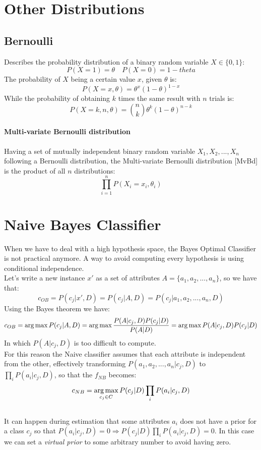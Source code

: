 \section{Other Distributions}

\subsection{Bernoulli}
Describes the probability distribution of a binary random variable $X \in \lbrace 0,1 \rbrace$:
\[P(X=1)=\theta \quad P(X=0)=1-theta\]
The probability of $X$ being a certain value $x$, given $\theta$ is:
\[P(X=x,\theta)=\theta^x(1-\theta)^{1-x}\]
While the probability of obtaining $k$ times the same result with $n$ trials is:
\[P(X=k,n,\theta)=\binom{n}{k} \theta^k(1-\theta)^{n-k}\]

\paragraph{Multi-variate Bernoulli distribution}
Having a set of mutually independent binary random variable $X_1,X_2,...,X_n$ following a Bernoulli distribution, the Multi-variate Bernoulli distribution [MvBd] is the product of all $n$ distributions:
\[\prod_{i=1}^n P(X_i=x_i,\theta_i)\]


\section{Naive Bayes Classifier}
When we have to deal with a high hypothesis space, the Bayes Optimal Classifier  is not practical anymore. A way to avoid computing every hypothesis is using conditional independence.\\
Let's write a new instance $x'$ as a set of attributes $A=\lbrace a_1,a_2,...,a_n\rbrace$, so we have that:
\[c_{OB}=P(c_j| x',D)=P(c_j| A,D)=P(c_j| a_1,a_2,...,a_n,D)\]
Using the Bayes theorem we have:
\[c_{OB}=\operatorname*{arg\,max} P(c_j| A,D)=\operatorname*{arg\,max} \frac{P(A|c_j,D)P(c_j|D)}{P(A|D)}=\operatorname*{arg\,max} P(A|c_j,D)P(c_j|D)\]
In which $P(A|c_j,D)$ is too difficult to compute.\\
For this reason the Naive classifier assumes that each attribute is independent from the other, effectively transforming $P(a_1,a_2,...,a_n|c_j,D)$ to $\prod_i P(a_i|c_j,D)$, so that the $f_{NB}$ becomes:
\[c_{NB}=\operatorname*{arg\,max}_{c_j \in C} P(c_j|D)\prod_i P(a_i|c_j,D)\]\\

It can happen during estimation that some attributes $a_i$ does not have a prior for a class $c_j$ so that $P(a_i|c_j,D)=0 \Rightarrow P(c_j|D)\prod_i P(a_i|c_j,D)=0$. In this case we can set a \textit{virtual prior} to some arbitrary number to avoid having zero.

